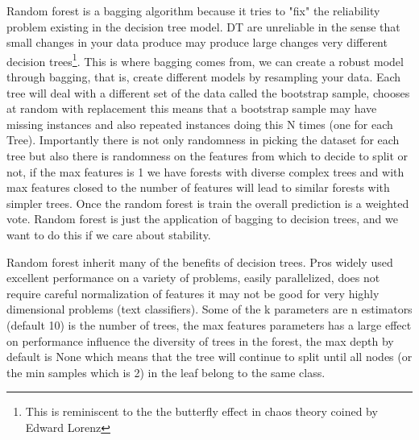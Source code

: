 \documentclass[11pt]{article}
\begin{document}


Random forest is a bagging algorithm because it tries to "fix" the reliability problem existing in the decision tree model. DT are unreliable in the sense that small changes in your data produce may produce large changes very different decision trees\footnote{This is reminiscent to the the butterfly effect in chaos theory coined by Edward Lorenz}. This is where bagging comes from, we can create a robust model through bagging, that is, create different models by resampling your data. Each tree will deal with a different set of the data called the bootstrap sample, chooses at random with replacement this means that a bootstrap sample may have missing instances and also repeated instances doing this N times (one for each Tree). Importantly there is not only randomness in picking the dataset for each tree but also there is randomness on the features from which to decide to split or not, if the max features is 1 we have forests with diverse complex trees and with max features closed to the number of features will lead to similar forests with simpler trees. Once the random forest is train the overall prediction is a weighted vote.
Random forest is just the application of bagging to decision trees, and we want to do this if we care about stability.

Random forest inherit many of the benefits of decision trees. Pros widely used excellent performance on a variety of problems, easily parallelized, does not require careful normalization of features it may not be good for very highly dimensional problems (text classifiers). Some of the k parameters are n estimators (default 10) is the number of trees, the max features parameters has a large effect on performance influence the diversity of trees in the forest, the max depth by default is None which means that the tree will continue to split until all nodes (or the min samples which is 2) in the leaf belong to the same class.

\end{document}
